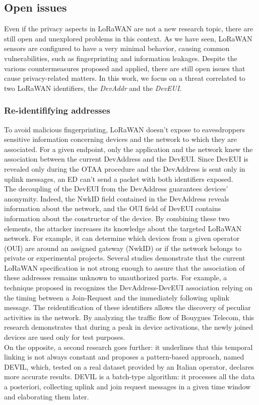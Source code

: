 \subsection{Open issues}
\label{address_identification}
Even if the privacy aspects in LoRaWAN are not a new research topic, there are still open and unexplored problems in this context. As we have seen, LoRaWAN sensors are configured to have a very minimal behavior, causing common vulnerabilities, such as fingerprinting and information leakages. Despite the various countermeasures proposed and applied, there are still open issues that cause privacy-related matters. In this work, we focus on a threat correlated to two LoRaWAN identifiers, the \textit{DevAddr} and the \textit{DevEUI}. 

\subsubsection{Re-identififying addresses}
To avoid malicious fingerprinting, LoRaWAN doesn't expose to eavesdroppers sensitive information concerning devices and the network to which they are associated. For a given endpoint, only the application and the network knew the association between the current DevAddress and the DevEUI. Since DevEUI is revealed only during the OTAA procedure and the DevAddress is sent only in uplink messages, an ED can't send a packet with both identifiers exposed. 
\\
The decoupling of the DevEUI from the DevAddress guarantees devices' anonymity. Indeed, the NwkID field contained in the DevAddress reveals information about the network, and the OUI field of DevEUI contains information about the constructor of the device. By combining these two elements, the attacker increases its knowledge about the targeted LoRaWAN network. For example, it can determine which devices from a given operator (OUI) are around an assigned gateway (NwkID) or if the network belongs to private or experimental projects. Several studies demonstrate that the current LoRaWAN specification is not strong enough to assure that the association of these addresses remains unknown to unauthorized parts. For example, a technique proposed in \cite{tech2020} recognizes the DevAddress-DevEUI association relying on the timing between a Join-Request and the immediately following uplink message. The reidentification of these identifiers allows the discovery of peculiar activities in the network. By analyzing the traffic flow of Bouygues Telecom, this research demonstrates that during a peak in device activations, the newly joined devices are used only for test purposes.
\\
On the opposite, a second research \cite{devil} goes further: it underlines that this temporal linking is not always constant and proposes a pattern-based approach, named DEVIL, which, tested on a real dataset provided by an Italian operator, declares more accurate results. DEVIL is a batch-type algorithm: it processes all the data a posteriori, collecting uplink and join request messages in a given time window and elaborating them later.

